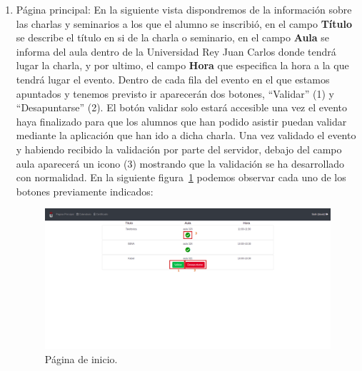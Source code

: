 \documentclass[a4paper, 12pt]{book}
\begin{document}
\begin{enumerate}
  \item Página principal: En la siguiente vista dispondremos de la información sobre las charlas y seminarios a los que el alumno se inscribió, en el campo \textbf{Título} se describe el título en si de la charla o seminario, en el campo \textbf{Aula} se informa del aula dentro de la Universidad Rey Juan Carlos donde tendrá lugar la charla, y por ultimo, el campo \textbf{Hora} que especifica la hora a la que tendrá lugar el evento.
  Dentro de cada fila del evento en el que estamos apuntados y tenemos previsto ir aparecerán dos botones, ``Validar'' (1) y ``Desapuntarse'' (2). El botón validar solo estará accesible una vez el evento haya finalizado para que los alumnos que han podido asistir puedan validar mediante la aplicación que han ido a dicha charla. Una vez validado el evento y habiendo recibido la validación por parte del servidor, debajo del campo aula aparecerá un icono (3) mostrando que la validación se ha desarrollado con normalidad. En la siguiente figura~\ref{fig:inicio} podemos observar cada uno de los botones previamente indicados:
  \begin{figure}
  	\centering
  	\includegraphics[width=16cm, keepaspectratio]{img/inicio.png}
  	\caption{Página de inicio.}\label{fig:inicio}
	\end{figure}
	

\end{enumerate}
\end{document}
